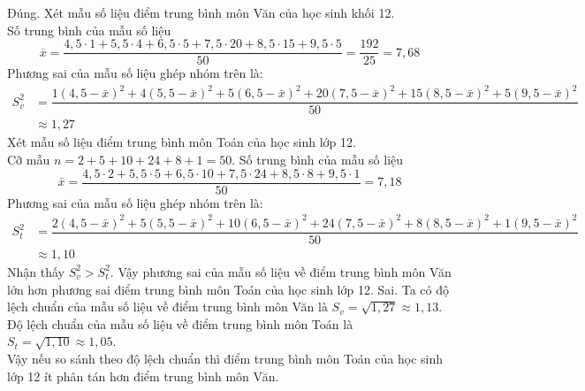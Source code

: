 \begin{ex}
{\begin{itemchoice}
			\itemch Đúng. Xét mẫu số liệu điểm trung bình môn Văn của học sinh khối 12. \\
			Số trung bình của mẫu số liệu
			$$\overline{{x}}=\dfrac{4{,}5 \cdot 1+5{,}5 \cdot 4+6{,}5 \cdot 5+7{,}5 \cdot 20+8{,}5 \cdot 15+9{,}5 \cdot 5}{50}=\dfrac{192}{25}=7{,}68$$
			Phương sai của mẫu số liệu ghép nhóm trên là:
			\begin{align*}
				S_{v}^{2}&=\dfrac{1(4{,}5-\bar{x})^{2}+4(5{,}5-\bar{x})^{2}+5(6{,}5-\bar{x})^{2}+20(7{,}5-\bar{x})^{2}+15(8{,}5-\bar{x})^{2}+5(9{,}5-\bar{x})^{2}}{50}\\
				& \approx 1{,}27
			\end{align*}
			Xét mẫu số liệu điểm trung bình môn Toán của học sinh lớp 12.\\
			Cỡ mẫu ${n}=2+5+10+24+8+1=50$. Số trung bình của mẫu số liệu 
			$$\bar{x}=\dfrac{4{,}5 \cdot 2+5{,}5 \cdot 5+6{,}5 \cdot 10+7{,}5 \cdot 24+8{,}5 \cdot 8+9{,}5 \cdot 1}{50}=7{,}18$$
			Phương sai của mẫu số liệu ghép nhóm trên là:
			\begin{align*}
				S_{{t}}^{2}&=\dfrac{2(4{,}5-\bar{x})^{2}+5(5{,}5-\bar{x})^{2}+10(6{,}5-\bar{x})^{2}+24(7{,}5-\bar{x})^{2}+8(8{,}5-\bar{x})^{2}+1(9{,}5-\bar{x})^{2}}{50}\\
				& \approx 1{,}10
			\end{align*}
			Nhận thấy $S_{v}^{2}>S_{t}^{2}$. Vậy phương sai của mẫu số liệu về điểm trung bình môn Văn lớn hơn phương sai điểm trung bình môn Toán của học sinh lớp 12.
			\itemch Sai. Ta có độ lệch chuẩn của mẫu số liệu về điểm trung bình môn Văn là $S_{v}=\sqrt{1,27} \approx 1,13$.\\
			Độ lệch chuẩn của mẫu số liệu về điểm trung bình môn Toán là $S_{t}=\sqrt{1,10} \approx 1,05$.\\
			Vậy nếu so sánh theo độ lệch chuẩn thì điểm trung bình môn Toán của học sinh lớp 12 ít phân tán hơn điểm trung bình môn Văn.
		\end{itemchoice}
	}
\end{ex}

